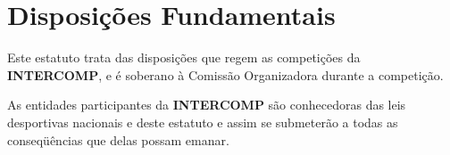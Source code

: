 \chapter{Disposições Fundamentais}

\begin{article}
	Este estatuto trata das disposições que regem as competições da \textbf{INTERCOMP}, e é soberano à Comissão Organizadora durante a competição.
\end{article}

\begin{article}
	As entidades participantes da \textbf{INTERCOMP} são conhecedoras das leis desportivas nacionais e deste estatuto e assim se submeterão a todas as conseqüências que delas possam emanar.
\end{article}

